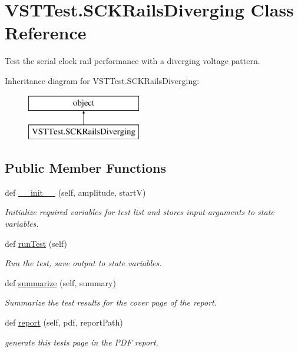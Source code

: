 \hypertarget{class_v_s_t_test_1_1_s_c_k_rails_diverging}{}\section{V\+S\+T\+Test.\+S\+C\+K\+Rails\+Diverging Class Reference}
\label{class_v_s_t_test_1_1_s_c_k_rails_diverging}


Test the serial clock rail performance with a diverging voltage pattern.  


Inheritance diagram for V\+S\+T\+Test.\+S\+C\+K\+Rails\+Diverging\+:\begin{figure}[H]
\begin{center}
\leavevmode
\includegraphics[height=2.000000cm]{class_v_s_t_test_1_1_s_c_k_rails_diverging}
\end{center}
\end{figure}
\subsection*{Public Member Functions}
\begin{DoxyCompactItemize}
\item 
def \hyperlink{class_v_s_t_test_1_1_s_c_k_rails_diverging_ac0d3b3b94a2fc52abedef04ad1da88da}{\+\_\+\+\_\+init\+\_\+\+\_\+} (self, amplitude, startV)
\begin{DoxyCompactList}\small\item\em Initialize required variables for test list and stores input arguments to state variables. \end{DoxyCompactList}\item 
def \hyperlink{class_v_s_t_test_1_1_s_c_k_rails_diverging_a225dac6408cf1468418fe421cdedb56e}{run\+Test} (self)
\begin{DoxyCompactList}\small\item\em Run the test, save output to state variables. \end{DoxyCompactList}\item 
def \hyperlink{class_v_s_t_test_1_1_s_c_k_rails_diverging_a958ccea76b2c7bdecfb5302a374b3333}{summarize} (self, summary)
\begin{DoxyCompactList}\small\item\em Summarize the test results for the cover page of the report. \end{DoxyCompactList}\item 
def \hyperlink{class_v_s_t_test_1_1_s_c_k_rails_diverging_a67a0a1dbf4b7b638edbb26ef821a08e2}{report} (self, pdf, report\+Path)
\begin{DoxyCompactList}\small\item\em generate this test\textquotesingle{}s page in the P\+DF report. \end{DoxyCompactList}\end{DoxyCompactItemize}


